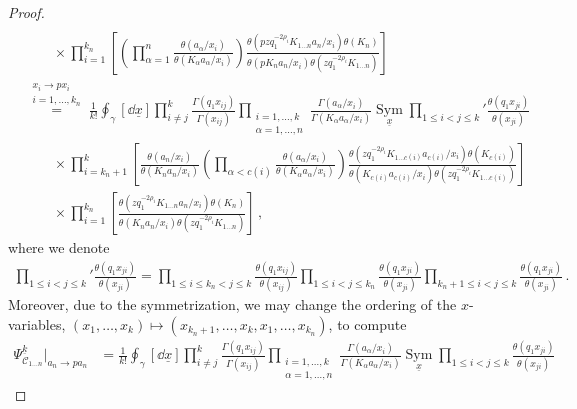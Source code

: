 \begin{proof}
\begin{align}
    \nonumber \\
    & \qquad \times \prod_{i=1}^{k_n} \left[ \left( \prod_{\alpha = 1}^n \frac{\theta(a_\alpha/x_i)}{\theta(K_\alpha a_\alpha / x_i)} \right) \frac{\theta(p z q_1^{-2\rho_i} K_{1\ldots n} a_{n}/x_i) \theta(K_{n})}{\theta(p K_{n} a_{n} / x_i) \theta(z q_1^{-2\rho_i} K_{1\ldots n})} \right]
    \nonumber \\
    & \stackrel{\substack{x_i \to p x_i \\ i=1,\ldots,k_n}}{=} \frac{1}{k!} \oint_\gamma [\dd{\underline{x}}] \prod_{i \neq j}^k \frac{\Gamma(q_1 x_{ij})}{\Gamma(x_{ij})} \prod_{\substack{i=1,\ldots,k \\ \alpha=1,\ldots,n}} \frac{\Gamma( a_\alpha/x_i)}{\Gamma(K_\alpha a_\alpha/x_i)} \operatorname*{Sym}_{\underline{x}} \prod_{1 \le i<j \le k}' \frac{\theta(q_1 x_{ji})}{\theta(x_{ji})}
    \nonumber \\
    & \qquad \times
    \prod_{i=k_n+1}^k \left[ \frac{\theta(a_n/x_i)}{\theta(K_n a_n/x_i)} \left( \prod_{\alpha < c(i)} \frac{\theta(a_\alpha/x_i)}{\theta(K_\alpha a_\alpha / x_i)} \right) \frac{\theta(z q_1^{-2\rho_i} K_{1\ldots c(i)} a_{c(i)}/x_i) \theta(K_{c(i)})}{\theta(K_{c(i)} a_{c(i)} / x_i) \theta(z q_1^{-2\rho_i} K_{1\ldots c(i)})} \right]
    \nonumber \\
    & \qquad \times 
    \prod_{i=1}^{k_n}
    \left[ \frac{\theta(z q_1^{-2\rho_i} K_{1\ldots n} a_{n}/x_i) \theta(K_{n})}{\theta(K_{n} a_{n} / x_i) \theta(z q_1^{-2\rho_i} K_{1\ldots n})} \right]
    \, ,
\end{align}
where we denote
\begin{align}
    \prod_{1 \le i<j \le k}' \frac{\theta(q_1 x_{ji})}{\theta(x_{ji})} = \prod_{1 \le i \le k_n < j \le k} \frac{\theta(q_1 x_{ij})}{\theta(x_{ij})} \prod_{1 \le i<j \le k_n} \frac{\theta(q_1 x_{ji})}{\theta(x_{ji})} \prod_{k_n + 1 \le i<j \le k} \frac{\theta(q_1 x_{ji})}{\theta(x_{ji})}
    \, .
\end{align}
Moreover, due to the symmetrization, we may change the ordering of the $x$-variables, $(x_1, \ldots, x_k) \mapsto (x_{k_n+1},\ldots,x_k,x_1,\ldots,x_{k_n})$, to compute
\begin{align}
    \Psi_{\mathscr{C}_{1\ldots n}}^{\underline{k}}\Big|_{a_n \to p a_n} 
    & = \frac{1}{k!} \oint_\gamma [\dd{\underline{x}}] \prod_{i \neq j}^k \frac{\Gamma(q_1 x_{ij})}{\Gamma(x_{ij})} \prod_{\substack{i=1,\ldots,k \\ \alpha=1,\ldots,n}} \frac{\Gamma( a_\alpha/x_i)}{\Gamma(K_\alpha a_\alpha/x_i)} \operatorname*{Sym}_{\underline{x}} \prod_{1 \le i<j \le k} \frac{\theta(q_1 x_{ji})}{\theta(x_{ji})}

\end{align}
\end{proof}
